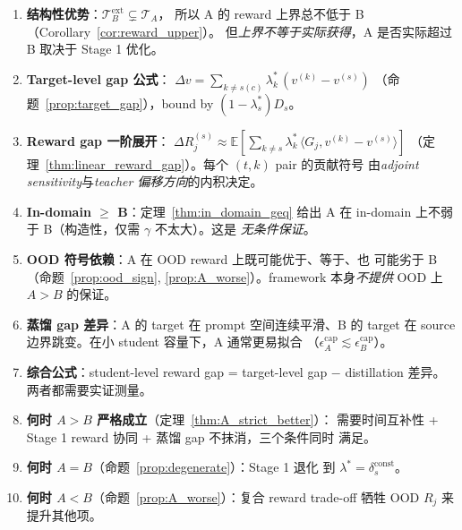 \documentclass[11pt,a4paper]{article}
\newcommand{\E}{\mathbb{E}}
\newcommand{\const}{\mathrm{const}}
\theoremstyle{definition}
\begin{document}
\begin{tcolorbox}[colback=yellow!5, colframe=yellow!60!black, title=\textbf{核心结论}]
\begin{enumerate}[leftmargin=1.5em]
\item \textbf{结构性优势}：$\mathcal{T}_B^{\text{ext}} \subsetneq \mathcal{T}_A$，
所以 A 的 reward 上界总不低于 B（Corollary~\ref{cor:reward_upper}）。
但\emph{上界不等于实际获得}，A 是否实际超过 B 取决于 Stage 1 优化。

\item \textbf{Target-level gap 公式}：
$\Delta v = \sum_{k \neq s(c)} \lambda_k^*\,(v^{(k)} - v^{(s)})$
（命题~\ref{prop:target_gap}），bound by $(1 - \lambda_s^*) D_s$。

\item \textbf{Reward gap 一阶展开}：
$\Delta R_j^{(s)} \approx \E[\sum_{k \neq s}\lambda_k^*\,\langle G_j, v^{(k)} - v^{(s)}\rangle]$
（定理~\ref{thm:linear_reward_gap}）。每个 $(t, k)$ pair 的贡献符号
由\emph{adjoint sensitivity}与\emph{teacher 偏移方向}的内积决定。

\item \textbf{In-domain $\geq$ B}：定理~\ref{thm:in_domain_geq} 给出
A 在 in-domain 上不弱于 B（构造性，仅需 $\gamma$ 不太大）。这是
\emph{无条件保证}。

\item \textbf{OOD 符号依赖}：A 在 OOD reward 上既可能优于、等于、也
可能劣于 B（命题~\ref{prop:ood_sign}, \ref{prop:A_worse}）。framework
本身\emph{不提供} OOD 上 $A > B$ 的保证。

\item \textbf{蒸馏 gap 差异}：A 的 target 在 prompt 空间连续平滑、B
的 target 在 source 边界跳变。在小 student 容量下，A 通常更易拟合
（$\epsilon_A^{\text{cap}} \lesssim \epsilon_B^{\text{cap}}$）。

\item \textbf{综合公式}：student-level reward gap =
target-level gap $-$ distillation 差异。两者都需要实证测量。

\item \textbf{何时 $A > B$ 严格成立}（定理~\ref{thm:A_strict_better}）：
需要时间互补性 + Stage 1 reward 协同 + 蒸馏 gap 不抹消，三个条件同时
满足。

\item \textbf{何时 $A = B$}（命题~\ref{prop:degenerate}）：Stage 1 退化
到 $\lambda^* = \delta_s^{\const}$。

\item \textbf{何时 $A < B$}（命题~\ref{prop:A_worse}）：复合 reward
trade-off 牺牲 OOD $R_j$ 来提升其他项。
\end{enumerate}
\end{tcolorbox}
\end{document}
